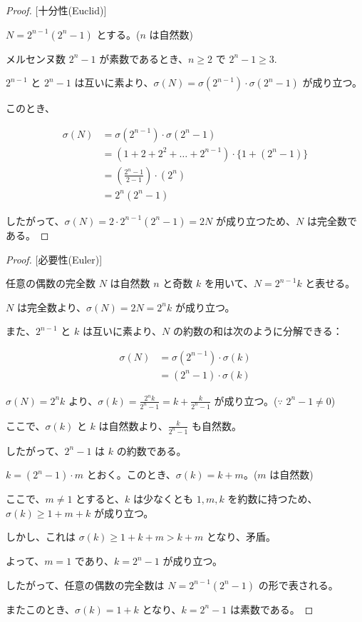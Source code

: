 \begin{proof}

[十分性(Euclid)]

\( N = 2^{n-1}(2^n - 1) \) とする。(\(n \) は自然数)

メルセンヌ数 \( 2^n - 1 \) が素数であるとき、\( n \geq 2 \) で \( 2^n - 1 \geq 3 \).

\( 2^{n-1} \) と \( 2^n - 1 \) は互いに素より、\( \sigma(N) = \sigma(2^{n-1}) \cdot \sigma(2^n - 1) \) が成り立つ。

このとき、

\begin{align*}
\sigma(N) &= \sigma(2^{n-1}) \cdot \sigma(2^n - 1) \\
          &= (1 + 2 + 2^2 + \ldots + 2^{n-1}) \cdot \{1 + (2^n - 1)\} \\
          &= (\frac{2^n-1}{2-1}) \cdot (2^n) \\
          &= 2^n(2^n - 1)
\end{align*}

したがって、\(\sigma(N) = 2 \cdot 2^{n-1}(2^n - 1) = 2N\) が成り立つため、\( N \) は完全数である。

\end{proof}

\begin{proof}

[必要性(Euler)]

任意の偶数の完全数 \( N \) は自然数 \( n \) と奇数 \( k \) を用いて、\( N = 2^{n-1}k \) と表せる。

\( N \) は完全数より、\(\sigma(N) = 2N = 2^{n}k\) が成り立つ。

また、\(2^{n-1}\) と \( k \) は互いに素より、\(N\) の約数の和は次のように分解できる：

\begin{align*}
\sigma(N) &= \sigma(2^{n-1}) \cdot \sigma(k) \\
          &= (2^n - 1) \cdot \sigma(k)
\end{align*}

\( \sigma(N) = 2^{n}k \) より、\( \sigma(k) = \frac{2^{n}k}{2^n - 1} = k + \frac{k}{2^n-1} \) が成り立つ。(\(\because \)  \(2^n - 1 \neq 0 \))

ここで、\(\sigma(k)\) と \(k\) は自然数より、\(\frac{k}{2^n-1}\) も自然数。

したがって、\(2^n - 1\) は \(k\) の約数である。

\(k = (2^n-1) \cdot m\) とおく。このとき、\( \sigma(k) = k + m \)。(\(m \) は自然数)

ここで、\( m \neq 1 \) とすると、\(k\) は少なくとも \(1, m, k \) を約数に持つため、
\(\sigma(k) \geq 1 + m + k\) が成り立つ。

しかし、これは \( \sigma(k) \geq 1 + k + m > k + m \) となり、矛盾。

よって、\( m = 1 \) であり、\( k = 2^n - 1 \) が成り立つ。

したがって、任意の偶数の完全数は \( N = 2^{n-1}(2^n - 1) \) の形で表される。

またこのとき、\(\sigma(k) = 1 + k \) となり、\( k = 2^n - 1 \) は素数である。

\end{proof}
